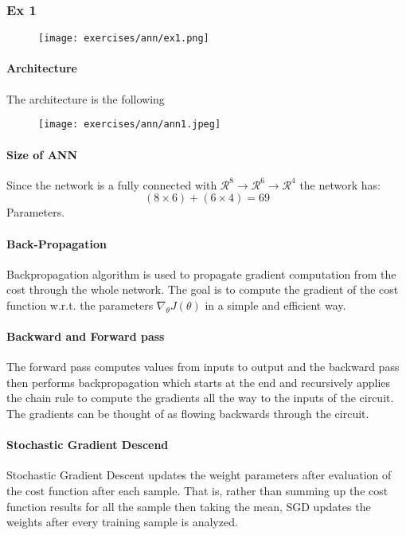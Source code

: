 \subsubsection{Ex 1}
\begin{figure}[H]
    \centering
    \texttt{[image: exercises/ann/ex1.png]}
\end{figure}


\paragraph{Architecture}
The architecture is the following
\begin{figure}[H]
    \centering
    \texttt{[image: exercises/ann/ann1.jpeg]}
\end{figure}

\paragraph{Size of ANN}
Since the network is a fully connected with $\mathcal{R}^8\rightarrow\mathcal{R}^6\to \mathcal{R}^4$ the network has:
\[(8 \times 6)+(6\times 4)=69\]
Parameters.



\paragraph{Back-Propagation}
Backpropagation algorithm is used to propagate gradient computation from the cost through the whole network. The goal is to compute the gradient of the cost function w.r.t. the parameters $\nabla_{\theta}J(\theta)$ in a simple and efficient way.

\paragraph{Backward and Forward pass}
The forward pass computes values from inputs to output and the backward pass then performs backpropagation which starts at the end and recursively applies the chain rule to compute the gradients all the way to the inputs of the circuit. The gradients can be thought of as flowing backwards through the circuit.


\paragraph{Stochastic Gradient Descend}
Stochastic Gradient Descent updates the weight parameters after evaluation of the cost function after each sample.  That is, rather than summing up the cost function results for all the sample then taking the mean, SGD updates the weights after every training sample is analyzed.

